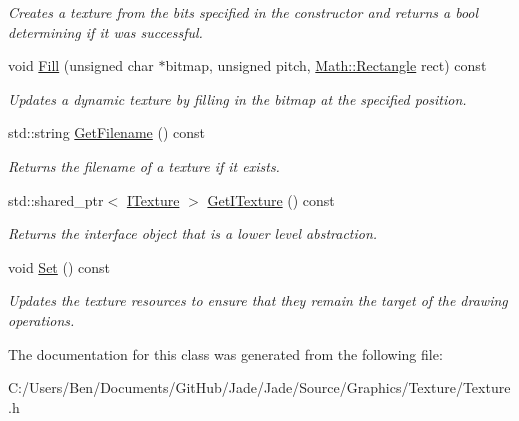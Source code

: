 \begin{DoxyCompactItemize}
\begin{DoxyCompactList}\small\item\em Creates a texture from the bits specified in the constructor and returns a bool determining if it was successful. \end{DoxyCompactList}\item 
\hypertarget{class_jade_1_1_graphics_1_1_texture_a90db27e5df529af06ad97b6cecf31d4e}{}void \hyperlink{class_jade_1_1_graphics_1_1_texture_a90db27e5df529af06ad97b6cecf31d4e}{Fill} (unsigned char $\ast$bitmap, unsigned pitch, \hyperlink{class_jade_1_1_math_1_1_rectangle}{Math\+::\+Rectangle} rect) const \label{class_jade_1_1_graphics_1_1_texture_a90db27e5df529af06ad97b6cecf31d4e}

\begin{DoxyCompactList}\small\item\em Updates a dynamic texture by filling in the bitmap at the specified position. \end{DoxyCompactList}\item 
\hypertarget{class_jade_1_1_graphics_1_1_texture_a7a74f8004ebcb57fc0eb3f13feccdb1d}{}std\+::string \hyperlink{class_jade_1_1_graphics_1_1_texture_a7a74f8004ebcb57fc0eb3f13feccdb1d}{Get\+Filename} () const \label{class_jade_1_1_graphics_1_1_texture_a7a74f8004ebcb57fc0eb3f13feccdb1d}

\begin{DoxyCompactList}\small\item\em Returns the filename of a texture if it exists. \end{DoxyCompactList}\item 
\hypertarget{class_jade_1_1_graphics_1_1_texture_accc5f797f7d2f9cf4c2b4f3b65dc8839}{}std\+::shared\+\_\+ptr$<$ \hyperlink{struct_jade_1_1_graphics_1_1_i_texture}{I\+Texture} $>$ \hyperlink{class_jade_1_1_graphics_1_1_texture_accc5f797f7d2f9cf4c2b4f3b65dc8839}{Get\+I\+Texture} () const \label{class_jade_1_1_graphics_1_1_texture_accc5f797f7d2f9cf4c2b4f3b65dc8839}

\begin{DoxyCompactList}\small\item\em Returns the interface object that is a lower level abstraction. \end{DoxyCompactList}\item 
\hypertarget{class_jade_1_1_graphics_1_1_texture_ac0ae4ca545b4428522d2db35b4be7ec2}{}void \hyperlink{class_jade_1_1_graphics_1_1_texture_ac0ae4ca545b4428522d2db35b4be7ec2}{Set} () const \label{class_jade_1_1_graphics_1_1_texture_ac0ae4ca545b4428522d2db35b4be7ec2}

\begin{DoxyCompactList}\small\item\em Updates the texture resources to ensure that they remain the target of the drawing operations. \end{DoxyCompactList}\end{DoxyCompactItemize}


The documentation for this class was generated from the following file\+:\begin{DoxyCompactItemize}
\item 
C\+:/\+Users/\+Ben/\+Documents/\+Git\+Hub/\+Jade/\+Jade/\+Source/\+Graphics/\+Texture/Texture.\+h\end{DoxyCompactItemize}
